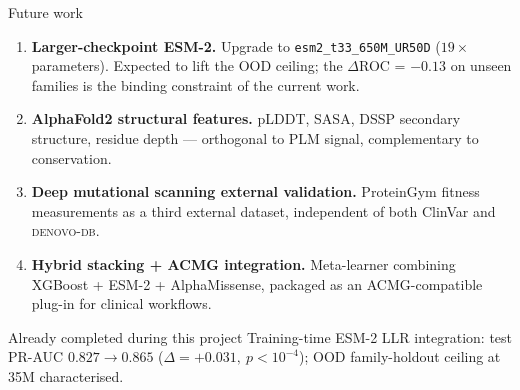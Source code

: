 
\begin{frame}{Future work}
  \begin{enumerate}\setlength{\itemsep}{0.5em}
    \item \textbf{Larger-checkpoint ESM-2.}
          Upgrade to \texttt{esm2\_t33\_650M\_UR50D} ($19{\times}$ parameters).
          Expected to lift the OOD ceiling; the $\Delta$ROC = $-0.13$ on
          unseen families is the binding constraint of the current work.

    \item \textbf{AlphaFold2 structural features.}
          pLDDT, SASA, DSSP secondary structure, residue depth ---
          orthogonal to PLM signal, complementary to conservation.

    \item \textbf{Deep mutational scanning external validation.}
          ProteinGym fitness measurements as a third external dataset,
          independent of both ClinVar and \textsc{denovo-db}.

    \item \textbf{Hybrid stacking + ACMG integration.}
          Meta-learner combining XGBoost + ESM-2 + AlphaMissense, packaged
          as an ACMG-compatible plug-in for clinical workflows.
  \end{enumerate}

  \vspace{0.6em}
  \begin{block}{Already completed during this project}
    Training-time ESM-2 LLR integration:
    test PR-AUC $0.827 \to 0.865$ ($\Delta = +0.031,\ p < 10^{-4}$);
    OOD family-holdout ceiling at 35M characterised.
  \end{block}
\end{frame}



